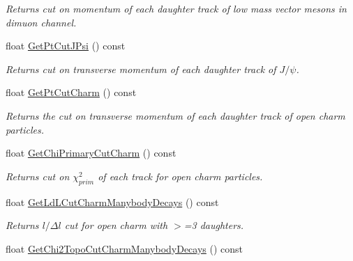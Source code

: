 \begin{DoxyCompactItemize}
\begin{DoxyCompactList}\small\item\em Returns cut on momentum of each daughter track of low mass vector mesons in dimuon channel. \end{DoxyCompactList}\item 
float \hyperlink{classKFParticleFinder_a7785aa7b862584afa9d86abdb8d7d291}{Get\+Pt\+Cut\+J\+Psi} () const \hypertarget{classKFParticleFinder_a7785aa7b862584afa9d86abdb8d7d291}{}\label{classKFParticleFinder_a7785aa7b862584afa9d86abdb8d7d291}

\begin{DoxyCompactList}\small\item\em Returns cut on transverse momentum of each daughter track of $J/\psi$. \end{DoxyCompactList}\item 
float \hyperlink{classKFParticleFinder_a0b9e1d2cf17d0fa91725d632963be39d}{Get\+Pt\+Cut\+Charm} () const \hypertarget{classKFParticleFinder_a0b9e1d2cf17d0fa91725d632963be39d}{}\label{classKFParticleFinder_a0b9e1d2cf17d0fa91725d632963be39d}

\begin{DoxyCompactList}\small\item\em Returns the cut on transverse momentum of each daughter track of open charm particles. \end{DoxyCompactList}\item 
float \hyperlink{classKFParticleFinder_a5b53d58daa9aae6146c8ef34753f31dd}{Get\+Chi\+Primary\+Cut\+Charm} () const \hypertarget{classKFParticleFinder_a5b53d58daa9aae6146c8ef34753f31dd}{}\label{classKFParticleFinder_a5b53d58daa9aae6146c8ef34753f31dd}

\begin{DoxyCompactList}\small\item\em Returns cut on $\chi^2_{prim}$ of each track for open charm particles. \end{DoxyCompactList}\item 
float \hyperlink{classKFParticleFinder_a91ffea6f886afaa17b87d2b16b737392}{Get\+Ld\+L\+Cut\+Charm\+Manybody\+Decays} () const \hypertarget{classKFParticleFinder_a91ffea6f886afaa17b87d2b16b737392}{}\label{classKFParticleFinder_a91ffea6f886afaa17b87d2b16b737392}

\begin{DoxyCompactList}\small\item\em Returns $l/\Delta l$ cut for open charm with $>$=3 daughters. \end{DoxyCompactList}\item 
float \hyperlink{classKFParticleFinder_a141dcccc0e44572925145c906d0b5d5b}{Get\+Chi2\+Topo\+Cut\+Charm\+Manybody\+Decays} () const \hypertarget{classKFParticleFinder_a141dcccc0e44572925145c906d0b5d5b}{}\label{classKFParticleFinder_a141dcccc0e44572925145c906d0b5d5b}


\end{DoxyCompactItemize}
